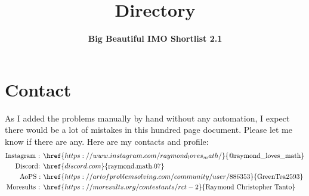 \documentclass[11pt]{scrartcl}
\begin{document}
\section*{Contact}
As I added the problems manually by hand without any automation, I expect there would be a lot of mistakes in this hundred page document. Please let me know if there are any. Here are my contacts and profile:
\begin{align*}
    \text{Instagram : } &\href{https://www.instagram.com/raymond_loves_math/}{\text{@raymond\_loves\_math}}\\
    \text{Discord: } &\href{discord.com}{\text{raymond.math.07}} \\ 
\text{AoPS : } &\href{https://artofproblemsolving.com/community/user/886353}{\text{GreenTea2593}}\\
\text{Moresults : } &\href{https://moresults.org/contestants/rct-2}{\text{Raymond Christopher Tanto}} \\ 
\end{align*}


\date{\textbf{Big Beautiful IMO Shortlist 2.1}}
\title{Directory}
\end{document}
